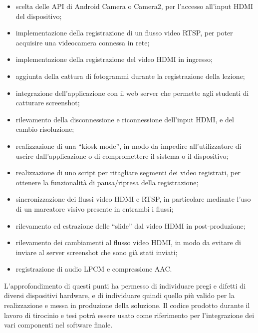 \begin{itemize}
  \item scelta delle API di Android Camera o Camera2, per l'accesso all'input HDMI del dispositivo;
  \item implementazione della registrazione di un flusso video RTSP, per poter acquisire una videocamera connessa in rete;
  \item implementazione della registrazione del video HDMI in ingresso;
  \item aggiunta della cattura di fotogrammi durante la registrazione della lezione;
  \item	integrazione dell'applicazione con il web server che permette agli studenti di catturare screenshot;
  \item	rilevamento della disconnessione e riconnessione dell'input HDMI, e del cambio risoluzione;
  \item	realizzazione di una “kiosk mode”, in modo da impedire all'utilizzatore di uscire dall'applicazione o di compromettere il sistema o il dispositivo;
  \item	realizzazione di uno script per ritagliare segmenti dei video registrati, per ottenere la funzionalità di pausa/ripresa della registrazione;
  \item	sincronizzazione dei flussi video HDMI e RTSP, in particolare mediante l'uso di un marcatore visivo presente in entrambi i flussi;
  \item	rilevamento ed estrazione delle “slide” dal video HDMI in post-produzione;
  \item	rilevamento dei cambiamenti al flusso video HDMI, in modo da evitare di inviare al server screenshot che sono già stati inviati;
  \item	registrazione di audio LPCM e compressione AAC.
\end{itemize}

L'approfondimento di questi punti ha permesso di individuare pregi e difetti di diversi dispositivi hardware, e di individuare quindi quello più valido per la realizzazione e messa in produzione della soluzione. Il codice prodotto durante il lavoro di tirocinio e tesi potrà essere usato come riferimento per l'integrazione dei vari componenti nel software finale.

